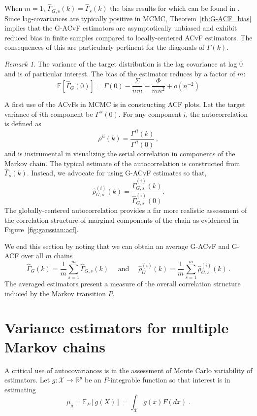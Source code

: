 \documentclass[11pt]{article}
\newcommand{\X}{\mathcal{X}}
\theoremstyle{remark}
\newtheorem{remark}{Remark}
\begin{document}
When $m = 1$, $\hat{\Gamma}_{G,s}(k) = \hat{\Gamma}_{s}(k)
$ the bias results for which can be found in \cite{priestley1981spectral}. Since lag-covariances are typically positive in MCMC, Theorem~\ref{th:G-ACF_bias} implies that the G-ACvF estimators are asymptotically unbiased and exhibit reduced bias in finite samples compared to locally-centered ACvF estimators. The consequences of this are particularly pertinent for the diagonals of $\Gamma(k)$.
\begin{remark} \label{rem:lag0_expectation}
The variance of the target distribution is the lag covariance at lag 0 and is of particular interest. The bias of the estimator reduces by a factor of $m$:
\[
\mathbb{E} \left[\hat{\Gamma}_{G}(0) \right] = \Gamma(0) - \dfrac{\Sigma}{mn} - \dfrac{\Phi}{mn^2} + o(n^{-2})
\]
\end{remark}



A first use of the ACvFs in MCMC is in constructing ACF plots. Let the target variance of $i${th} component be $\Gamma^{ii}(0)$. For any component $i$, the autocorrelation is defined as
\[
\rho^{ii}(k) = \dfrac{\Gamma^{ii}(k)}{\Gamma^{ii}(0)}\,,
\]
and is instrumental in visualizing the serial correlation in components of the Markov chain. The typical estimate of the autocorrelation is constructed from $\hat{\Gamma}_s(k)$. Instead, we advocate for using G-ACvF estimates so that,
\[
\hat{\rho}_{G,s}^{(i)}(k) = \dfrac{ \hat{\Gamma}^{(i)}_{G,s} (k)}{\hat{\Gamma}^{(i)}_{G,s} (0)}.
\]
The globally-centered autocorrelation provides a far more realistic assessment of the correlation structure of marginal components of the chain  as evidenced in Figure~\ref{fig:gaussian:acf}. 

We end this section by noting that we can obtain an average G-ACvF and G-ACF over all $m$ chains
\[
\hat{\Gamma}_G(k) = \dfrac{1}{m}\sum_{s=1}^m \hat{\Gamma}_{G,s}(k) \quad \text{ and } \quad \hat{\rho}^{(i)}_G(k) = \dfrac{1}{m}\sum_{s=1}^m \hat{\rho}^{(i)}_{G,s}(k)\,.
\]
The averaged estimators present a measure of the overall correlation structure induced by the Markov transition $P$. 

\section{Variance estimators for multiple Markov chains} \label{sec:variance_est}

A critical use of autocovariances is in the assessment of Monte Carlo variability of estimators.  Let $g:\X \longrightarrow \mathbb{R}^p$ be an $F$-integrable function so that interest is in estimating
%
\[
\mu_g = \mathbb{E}_F[g(X)] = \int_{\X}g(x)F(dx)\;.
\]
 
\end{document}
